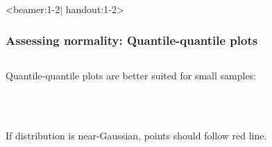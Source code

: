 \documentclass[t]{beamer} %
\begin{document}
\begin{frame}<beamer:1-2| handout:1-2>
  \frametitle{Assessing normality: Quantile-quantile plots}
  
  \begin{columns}[c]
    \begin{column}{4cm}
      Quantile-quantile plots are better suited for small samples:\\[0.5em]
      \begin{small}
        \\
        \\[1.5em]
      \end{small}
      If distribution is near-Gaussian, points should follow red line.\\[1.5em]
   \end{column}
    \begin{column}{6cm}
    \end{column}
  \end{columns}
\end{frame}
\end{document}
